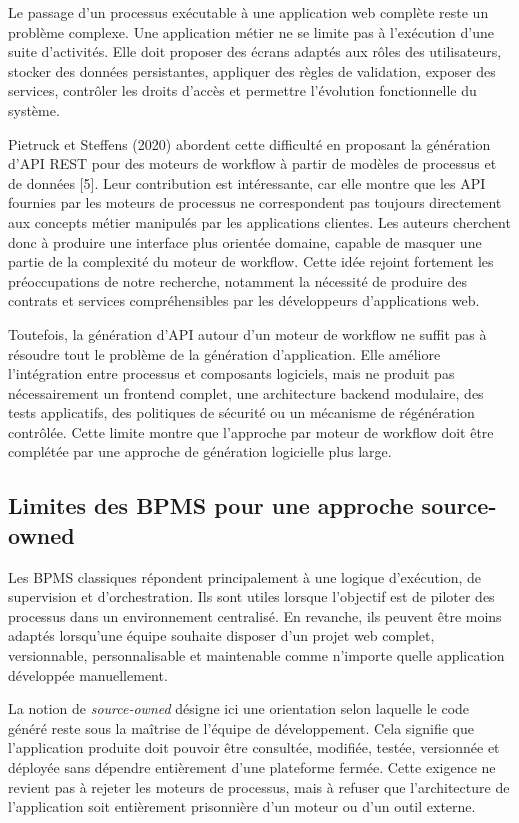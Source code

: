 Le passage d'un processus exécutable à une application web complète reste un problème complexe. Une application métier ne se limite pas à l'exécution d'une suite d'activités. Elle doit proposer des écrans adaptés aux rôles des utilisateurs, stocker des données persistantes, appliquer des règles de validation, exposer des services, contrôler les droits d'accès et permettre l'évolution fonctionnelle du système.

Pietruck et Steffens (2020) abordent cette difficulté en proposant la génération d'API REST pour des moteurs de workflow à partir de modèles de processus et de données [5]. Leur contribution est intéressante, car elle montre que les API fournies par les moteurs de processus ne correspondent pas toujours directement aux concepts métier manipulés par les applications clientes. Les auteurs cherchent donc à produire une interface plus orientée domaine, capable de masquer une partie de la complexité du moteur de workflow. Cette idée rejoint fortement les préoccupations de notre recherche, notamment la nécessité de produire des contrats et services compréhensibles par les développeurs d'applications web.

Toutefois, la génération d'API autour d'un moteur de workflow ne suffit pas à résoudre tout le problème de la génération d'application. Elle améliore l'intégration entre processus et composants logiciels, mais ne produit pas nécessairement un frontend complet, une architecture backend modulaire, des tests applicatifs, des politiques de sécurité ou un mécanisme de régénération contrôlée. Cette limite montre que l'approche par moteur de workflow doit être complétée par une approche de génération logicielle plus large.

\subsection{Limites des BPMS pour une approche source-owned}

Les BPMS classiques répondent principalement à une logique d'exécution, de supervision et d'orchestration. Ils sont utiles lorsque l'objectif est de piloter des processus dans un environnement centralisé. En revanche, ils peuvent être moins adaptés lorsqu'une équipe souhaite disposer d'un projet web complet, versionnable, personnalisable et maintenable comme n'importe quelle application développée manuellement.

La notion de \textit{source-owned} désigne ici une orientation selon laquelle le code généré reste sous la maîtrise de l'équipe de développement. Cela signifie que l'application produite doit pouvoir être consultée, modifiée, testée, versionnée et déployée sans dépendre entièrement d'une plateforme fermée. Cette exigence ne revient pas à rejeter les moteurs de processus, mais à refuser que l'architecture de l'application soit entièrement prisonnière d'un moteur ou d'un outil externe.

